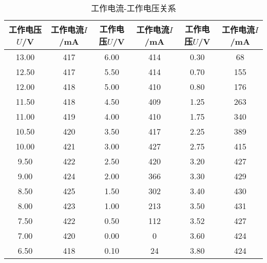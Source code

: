 \begin{table}[htbp!]
	\centering\small
	\caption{工作电流-工作电压关系}\label{tab:IV}	\begin{tabular}{c||c|c|c|c|c}
		\hline\hline
		工作电压$U$/V & 工作电流$I$/mA & 工作电压$U$/V & 工作电流$I$/mA & 工作电压$U$/V & 工作电流$I$/mA\\		\hline\hline
		13.00 & 417 & 6.00 & 414 & 0.30 & 68\\		\hline
		12.50 & 417 & 5.50 & 414 & 0.70 & 155\\		\hline
		12.00 & 418 & 5.00 & 410 & 0.80 & 176\\		\hline
		11.50 & 418 & 4.50 & 409 & 1.25 & 263\\		\hline
		11.00 & 419 & 4.00 & 410 & 1.75 & 340\\		\hline
		10.50 & 420 & 3.50 & 417 & 2.25 & 389\\		\hline
		10.00 & 421 & 3.00 & 427 & 2.75 & 415\\		\hline
		9.50 & 422 & 2.50 & 420 & 3.20 & 427\\		\hline
		9.00 & 424 & 2.00 & 366 & 3.30 & 429\\		\hline
		8.50 & 425 & 1.50 & 302 & 3.40 & 430\\		\hline
		8.00 & 423 & 1.00 & 213 & 3.50 & 431\\		\hline
		7.50 & 422 & 0.50 & 112 & 3.52 & 427\\		\hline
		7.00 & 420 & 0.00 & 0 & 3.60 & 424\\		\hline
		6.50 & 418 & 0.10 & 24 & 3.80 & 424\\		\hline\hline
	\end{tabular}
\end{table}